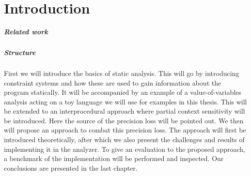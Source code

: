 
\chapter{Introduction}\label{chapter:introduction}


\paragraph{Related work}

\paragraph{Structure} 
First we will introduce the basics of static analysis. This will go by introducing constraint systems and how these are used to gain information about the program statically. It will be accompanied by an example of a value-of-variables analysis acting on a toy language we will use for examples in this thesis. This will be extended to an interprocedural approach where partial context sensitivity will be introduced. Here the source of the precision loss will be pointed out. We then will propose an approach to combat this precision loss. The approach will first be introduced theoretically, after which we also present the challenges and results of implementing it in the \gob analyzer. To give an evaluation to the proposed approach, a benchmark of the implementation will be performed and inspected. Our conclusions are presented in the last chapter.

